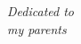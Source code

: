 
\vspace*{\fill}

\begin{center}
{\it Dedicated to}\\
{\it my parents}
\end{center}

\vspace*{\fill}
